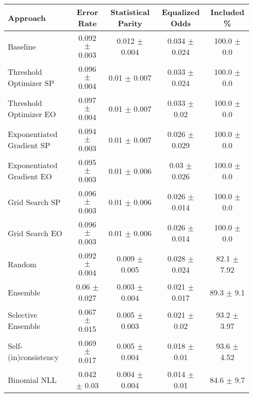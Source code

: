 \begin{tabular} {lcccc}
\toprule
\textbf{Approach} & \textbf{Error Rate} & \textbf{Statistical Parity} & \textbf{Equalized Odds} & \textbf{Included \%} \\ \midrule
Baseline & 0.092 $\pm$ 0.003 & 0.012 $\pm$ 0.004 & 0.034 $\pm$ 0.024 & \cellcolor{gold!30}100.0 $\pm$ 0.0 \\ 
Threshold Optimizer SP & 0.096 $\pm$ 0.004 & 0.01 $\pm$ 0.007 & 0.033 $\pm$ 0.024 & \cellcolor{gold!30}100.0 $\pm$ 0.0 \\ 
Threshold Optimizer EO & 0.097 $\pm$ 0.004 & 0.01 $\pm$ 0.007 & 0.033 $\pm$ 0.02 & \cellcolor{gold!30}100.0 $\pm$ 0.0 \\ 
Exponentiated Gradient SP & 0.094 $\pm$ 0.003 & 0.01 $\pm$ 0.007 & 0.026 $\pm$ 0.029 & \cellcolor{gold!30}100.0 $\pm$ 0.0 \\ 
Exponentiated Gradient EO & 0.095 $\pm$ 0.003 & 0.01 $\pm$ 0.006 & 0.03 $\pm$ 0.026 & \cellcolor{gold!30}100.0 $\pm$ 0.0 \\ 
Grid Search SP & 0.096 $\pm$ 0.003 & 0.01 $\pm$ 0.006 & 0.026 $\pm$ 0.014 & \cellcolor{gold!30}100.0 $\pm$ 0.0 \\ 
Grid Search EO & 0.096 $\pm$ 0.003 & 0.01 $\pm$ 0.006 & 0.026 $\pm$ 0.014 & \cellcolor{gold!30}100.0 $\pm$ 0.0 \\ 
Random & 0.092 $\pm$ 0.004 & 0.009 $\pm$ 0.005 & 0.028 $\pm$ 0.024 & 82.1 $\pm$ 7.92 \\ 
Ensemble & \cellcolor{silver!30}0.06 $\pm$ 0.027 & \cellcolor{gold!30}0.003 $\pm$ 0.004 & \cellcolor{bronze!30}0.021 $\pm$ 0.017 & 89.3 $\pm$ 9.1 \\ 
Selective Ensemble & \cellcolor{bronze!30}0.067 $\pm$ 0.015 & \cellcolor{bronze!30}0.005 $\pm$ 0.003 & \cellcolor{bronze!30}0.021 $\pm$ 0.02 & 93.2 $\pm$ 3.97 \\ 
Self-(in)consistency & 0.069 $\pm$ 0.017 & \cellcolor{bronze!30}0.005 $\pm$ 0.004 & \cellcolor{silver!30}0.018 $\pm$ 0.01 & 93.6 $\pm$ 4.52 \\ 
Binomial NLL & \cellcolor{gold!30}0.042 $\pm$ 0.03 & \cellcolor{silver!30}0.004 $\pm$ 0.004 & \cellcolor{gold!30}0.014 $\pm$ 0.01 & 84.6 $\pm$ 9.7 \\ 
\bottomrule
\end{tabular}

